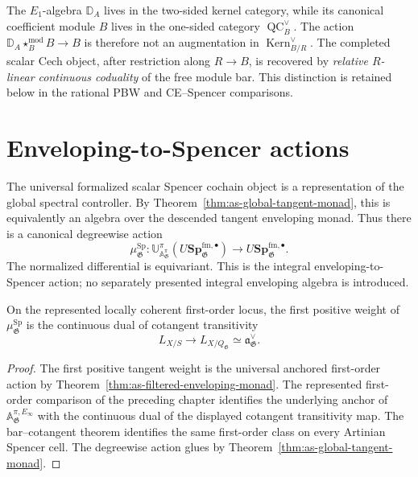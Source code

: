 \begin{remark}
\label{rem:as-kernel-versus-scalar-action}
The $E_1$-algebra $\mathbb D_A$ lives in the two-sided kernel category, while
its canonical coefficient module $B$ lives in the one-sided category
$\operatorname{QC}^{\vee}_B$.  The action
$\mathbb D_A\star_B^{\mathrm{mod}}B\to B$ is therefore not an augmentation in
$\operatorname{Kern}^{\vee}_{B/R}$.  The completed scalar Cech object, after restriction along $R\to B$, is
recovered by \emph{relative $R$-linear continuous coduality} of the free
module bar.  This distinction is retained below in the rational PBW and
CE--Spencer comparisons.
\end{remark}


\section{Enveloping-to-Spencer actions}
\label{sec:as-enveloping}

The universal formalized scalar Spencer cochain object is a representation of
the global spectral controller.  By
Theorem~\ref{thm:as-global-tangent-monad}, this is equivalently an algebra
over the descended tangent enveloping monad.  Thus there is a canonical
degreewise action
\[
\boxed{
    \mu_{\mathfrak G}^{\mathrm{Sp}}:
    \mathbb U^\pi_{\mathbb A^\pi_{\mathfrak G}}
    \left(
        U\mathbf{Sp}_{\mathfrak G}^{\mathrm{fm},\bullet}
    \right)
    \longrightarrow
    U\mathbf{Sp}_{\mathfrak G}^{\mathrm{fm},\bullet}.
}
\]
The normalized differential is equivariant.  This is the integral
enveloping-to-Spencer action; no separately presented integral enveloping
algebra is introduced.

\begin{proposition}
\label{prop:as-first-graded-comparison}
On the represented locally coherent first-order locus, the first positive
weight of
$\mu_{\mathfrak G}^{\mathrm{Sp}}$
is the continuous dual of cotangent transitivity
\[
\boxed{
    L_{X/S}
    \longrightarrow
    L_{X/Q_{\mathfrak G}}
    \simeq
    \mathfrak a_{\mathfrak G}^{\vee}.
}
\]
\end{proposition}

\begin{proof}
The first positive tangent weight is the universal anchored first-order
action by
Theorem~\ref{thm:as-filtered-enveloping-monad}.  The represented first-order
comparison of the preceding chapter identifies the underlying anchor of
$\mathbb A_{\mathfrak G}^{\pi,E_\infty}$ with the continuous dual of the
displayed cotangent transitivity map.  The bar--cotangent theorem identifies
the same first-order class on every Artinian Spencer cell.  The degreewise
action glues by
Theorem~\ref{thm:as-global-tangent-monad}.
\end{proof}

